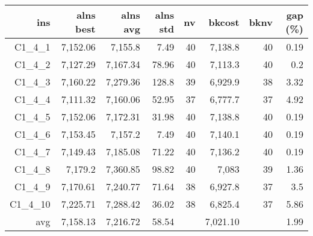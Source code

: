   \begin{table}[caption={Kết quả đo với tập HG\_C\_1\_4 400 yêu cầu}, label=exp:HGC14]
    \small
    \centering
    \begin{tabular}{rrrrrrrr}
    \hline
    ins & alns best & alns avg & alns std & nv & bkcost & bknv & gap (\%) \\ \hline
    C1\_4\_1 & 7,152.06 & 7,155.8 & 7.49 & 40 & 7,138.8 & 40 & 0.19 \\ \hline
    C1\_4\_2 & 7,127.29 & 7,167.34 & 78.96 & 40 & 7,113.3 & 40 & 0.2 \\ \hline
    C1\_4\_3 & 7,160.22 & 7,279.36 & 128.8 & 39 & 6,929.9 & 38 & 3.32 \\ \hline
    C1\_4\_4 & 7,111.32 & 7,160.06 & 52.95 & 37 & 6,777.7 & 37 & 4.92 \\ \hline
    C1\_4\_5 & 7,152.06 & 7,172.31 & 31.98 & 40 & 7,138.8 & 40 & 0.19 \\ \hline
    C1\_4\_6 & 7,153.45 & 7,157.2 & 7.49 & 40 & 7,140.1 & 40 & 0.19 \\ \hline
    C1\_4\_7 & 7,149.43 & 7,185.08 & 71.22 & 40 & 7,136.2 & 40 & 0.19 \\ \hline
    C1\_4\_8 & 7,179.2 & 7,360.85 & 98.82 & 40 & 7,083 & 39 & 1.36 \\ \hline
    C1\_4\_9 & 7,170.61 & 7,240.77 & 71.64 & 38 & 6,927.8 & 37 & 3.5 \\ \hline
    C1\_4\_10 & 7,225.71 & 7,288.42 & 36.02 & 38 & 6,825.4 & 37 & 5.86 \\ \hline
    avg & 7,158.13 & 7,216.72 & 58.54 & & 7,021.10 & & 1.99 \\ \hline
    \end{tabular}
  \end{table}

